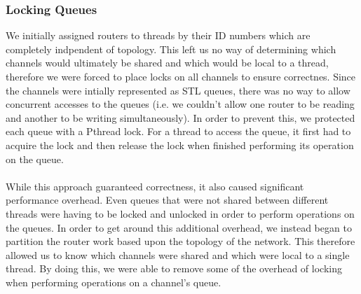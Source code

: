 \documentclass{article}
\begin{document}
\begin{multicols}{2}
\subsubsection{Locking Queues}
We initially assigned routers to threads by their ID numbers which are completely indpendent of
topology.  This left us no way of determining which channels would
ultimately be shared and which would be local to a thread, therefore we
were forced to place locks on all channels to ensure correctnes.  Since
the channels were intially represented as STL queues, there was no way to
allow concurrent accesses to the queues (i.e. we couldn't allow one router
to be reading and another to be writing simultaneously).  In order to
prevent this, we protected each queue with a Pthread lock.  For a thread
to access the queue, it first had to acquire the lock and then release the
lock when finished performing its operation on the queue.\\
~\\
While this approach guaranteed correctness, it also caused significant
performance overhead.  Even queues that were not shared between different
threads were having to be locked and unlocked in order to perform
operations on the queues.  In order to get around this additional
overhead, we instead began to partition the router work based upon the
topology of the network.  This therefore allowed us to know which channels
were shared and which were local to a single thread.  By doing this, we
were able to remove some of the overhead of locking when performing
operations on a channel's queue.


\end{multicols}
\end{document}
